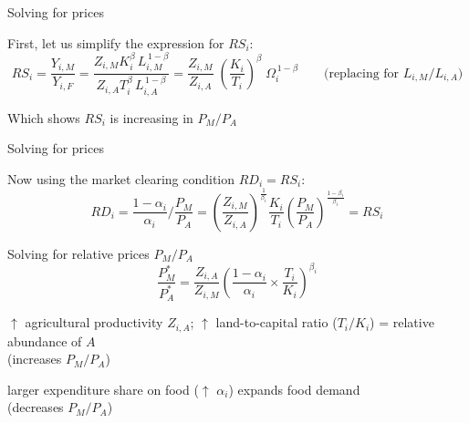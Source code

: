 \documentclass[notes,11pt, aspectratio=169, xcolor=table]{beamer}
\newenvironment{wideitemize}{\itemize\addtolength{\itemsep}{10pt}}{\enditemize}
\begin{document}
\begin{frame}{Solving for prices}
\begin{wideitemize}
    \item First, let us simplify the expression for $RS_i$:
    {\scriptsize
    \begin{equation*}
        RS_i = \frac{Y_{i,M}}{Y_{i,F}}
      = \frac{Z_{i,M}K_i^{\beta}\,L_{i,M}^{\,1-\beta}}
              {Z_{i,A}T_i^{\beta}\,L_{i,A}^{\,1-\beta}}
       =\frac{Z_{i,M}}{Z_{i,A}}\;
         \left( \frac{K_i}{T_i} \right)^{\beta}\;
         \Omega_i^{\,1-\beta} \qquad \text{(replacing for }L_{i,M}/L_{i,A} )
    \end{equation*}
    }

    \item<4-> Which shows $RS_i$ is increasing in $P_M / P_A$ 
\end{wideitemize}
\end{frame}


\begin{frame}{Solving for prices}
\begin{wideitemize}
    \item Now using the market clearing condition $RD_i=RS_i$:
    \begin{equation*}
        RD_i =  \frac{1-\alpha_i}{\alpha_i} / \frac{P_{M}}{P_{A}} = \left( \frac{Z_{i,M}}{Z_{i,A}} \right)^{\frac{1}{\beta_i}} \frac{K_i}{T_i}   \left( \frac{P_{M} }{P_{A} } \right)^{\frac{1-\beta_i}{\beta_i}}  = RS_i
    \end{equation*}
    \item<2-> Solving for relative prices $P_M/P_A$
    \begin{equation*}
         \frac{P_{M}^*}{P_{A}^*} =  \frac{Z_{i,A}}{Z_{i,M}} \left( \frac{1-\alpha_i}{\alpha_i} \times \frac{T_i}{K_i} \right)^{\beta_i}
    \end{equation*}

    \item<3-> $\uparrow$ agricultural productivity $Z_{i,A}$; $\uparrow$ land-to-capital ratio ($T_i / K_i$) = relative abundance of $A$ \\
    \qquad (increases $P_M/P_A$)

    \item<4-> larger expenditure share on food ($\uparrow$ $\alpha_i$) expands food demand \\ 
    \qquad (decreases $P_M/P_A$)
    

\end{wideitemize}
\end{frame}
\end{document}
